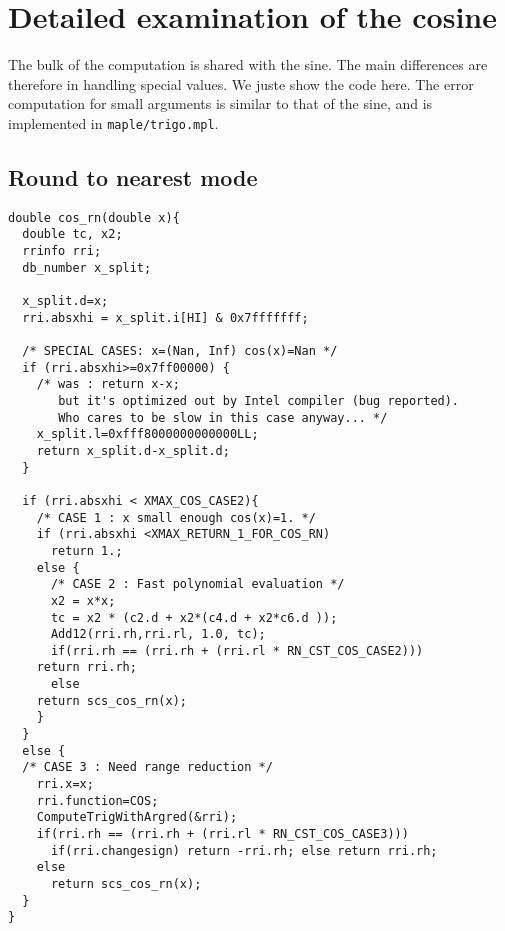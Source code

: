 \section{Detailed examination of the cosine}
The bulk of the computation is shared with the sine.  The main
differences are therefore in handling special values. We juste show
the code here. The error computation for small arguments is similar to
that of the sine, and is implemented in \texttt{maple/trigo.mpl}.

\subsection{Round to nearest mode}
\begin{lstlisting}[caption={Exceptional cases for cosine RN},firstnumber=1]
double cos_rn(double x){
  double tc, x2;
  rrinfo rri;
  db_number x_split;

  x_split.d=x;
  rri.absxhi = x_split.i[HI] & 0x7fffffff;

  /* SPECIAL CASES: x=(Nan, Inf) cos(x)=Nan */
  if (rri.absxhi>=0x7ff00000) {
    /* was : return x-x;
       but it's optimized out by Intel compiler (bug reported).
       Who cares to be slow in this case anyway... */
    x_split.l=0xfff8000000000000LL;
    return x_split.d-x_split.d;
  }

  if (rri.absxhi < XMAX_COS_CASE2){
    /* CASE 1 : x small enough cos(x)=1. */
    if (rri.absxhi <XMAX_RETURN_1_FOR_COS_RN)
      return 1.;
    else {
      /* CASE 2 : Fast polynomial evaluation */
      x2 = x*x;
      tc = x2 * (c2.d + x2*(c4.d + x2*c6.d ));
      Add12(rri.rh,rri.rl, 1.0, tc);
      if(rri.rh == (rri.rh + (rri.rl * RN_CST_COS_CASE2)))
	return rri.rh;
      else
	return scs_cos_rn(x);
    }
  }
  else {
  /* CASE 3 : Need range reduction */
    rri.x=x;
    rri.function=COS;
    ComputeTrigWithArgred(&rri);
    if(rri.rh == (rri.rh + (rri.rl * RN_CST_COS_CASE3)))
      if(rri.changesign) return -rri.rh; else return rri.rh;
    else
      return scs_cos_rn(x);
  }
}
\end{lstlisting}

